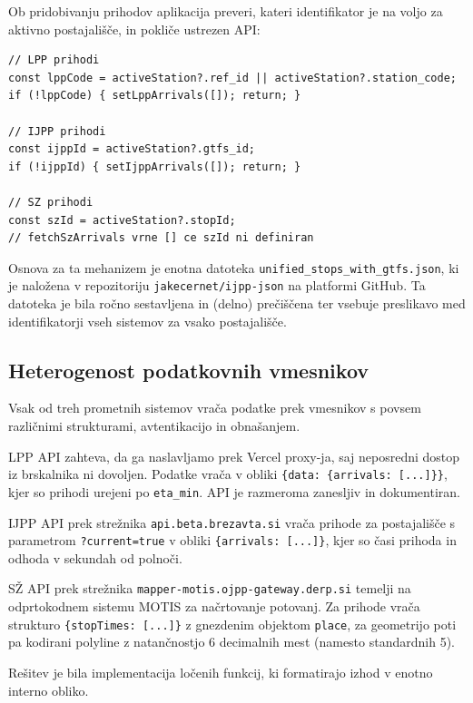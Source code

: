 \documentclass[12pt]{article}
\begin{document}
Ob pridobivanju prihodov aplikacija preveri, kateri identifikator je na voljo za aktivno postajališče, in pokliče ustrezen API:

\begin{lstlisting}[caption={Pogojno klicanje API-jev glede na razpoložljive identifikatorje}, label={lst:idcheck}]
// LPP prihodi
const lppCode = activeStation?.ref_id || activeStation?.station_code;
if (!lppCode) { setLppArrivals([]); return; }

// IJPP prihodi
const ijppId = activeStation?.gtfs_id;
if (!ijppId) { setIjppArrivals([]); return; }

// SZ prihodi
const szId = activeStation?.stopId;
// fetchSzArrivals vrne [] ce szId ni definiran
\end{lstlisting}

Osnova za ta mehanizem je enotna datoteka \texttt{unified\_stops\_with\_gtfs.json}, ki je naložena v repozitoriju \texttt{jakecernet/ijpp-json} na platformi GitHub. Ta datoteka je bila ročno sestavljena in (delno) prečiščena ter vsebuje preslikavo med identifikatorji vseh sistemov za vsako postajališče.

\subsection{Heterogenost podatkovnih vmesnikov}

Vsak od treh prometnih sistemov vrača podatke prek vmesnikov s povsem različnimi strukturami, avtentikacijo in obnašanjem.

LPP API zahteva, da ga naslavljamo prek Vercel proxy-ja, saj neposredni dostop iz brskalnika ni dovoljen. Podatke vrača v obliki \texttt{\{data: \{arrivals: [...]\}\}}, kjer so prihodi urejeni po \texttt{eta\_min}. API je razmeroma zanesljiv in dokumentiran.

IJPP API prek strežnika \texttt{api.beta.brezavta.si} vrača prihode za postajališče s parametrom \texttt{?current=true} v obliki \texttt{\{arrivals: [...]\}}, kjer so časi prihoda in odhoda v sekundah od polnoči.

SŽ API prek strežnika \texttt{mapper-motis.ojpp-gateway.derp.si} temelji na odprtokodnem sistemu MOTIS \cite{motis} za načrtovanje potovanj. Za prihode vrača strukturo \texttt{\{stopTimes: [...]\}} z gnezdenim objektom \texttt{place}, za geometrijo poti pa kodirani polyline z natančnostjo 6 decimalnih mest (namesto standardnih 5).

Rešitev je bila implementacija ločenih funkcij, ki formatirajo izhod v enotno interno obliko.
\end{document}
